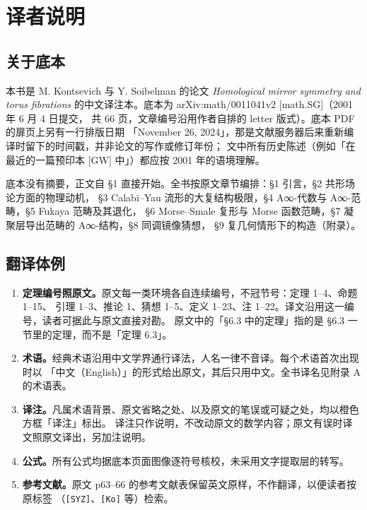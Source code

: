 \section*{译者说明}

\subsection*{关于底本}

本书是 M. Kontsevich 与 Y. Soibelman 的论文 \emph{Homological mirror symmetry and torus
fibrations} 的中文译注本。底本为 arXiv:math/0011041v2 [math.SG]（2001 年 6 月 4 日提交，
共 66 页，文章编号沿用作者自排的 letter 版式）。底本 PDF 的扉页上另有一行排版日期
「November 26, 2024」，那是文献服务器后来重新编译时留下的时间戳，并非论文的写作或修订年份；
文中所有历史陈述（例如「在最近的一篇预印本 [GW] 中」）都应按 2001 年的语境理解。

底本没有摘要，正文自 §1 直接开始。全书按原文章节编排：§1 引言，§2 共形场论方面的物理动机，
§3 Calabi–Yau 流形的大复结构极限，§4 A∞-代数与 A∞-范畴，§5 Fukaya 范畴及其退化，
§6 Morse–Smale 复形与 Morse 函数范畴，§7 凝聚层导出范畴的 A∞-结构，§8 同调镜像猜想，
§9 复几何情形下的构造（附录）。

\subsection*{翻译体例}

\begin{enumerate}[leftmargin=2.2em,itemsep=2pt]
\item \textbf{定理编号照原文。}原文每一类环境各自连续编号，不冠节号：定理 1–4、命题 1–15、
      引理 1–3、推论 1、猜想 1–5、定义 1–23、注 1–22。译文沿用这一编号，读者可据此与原文直接对勘。
      原文中的「§6.3 中的定理」指的是 §6.3 一节里的定理，而不是「定理 6.3」。
\item \textbf{术语。}经典术语沿用中文学界通行译法，人名一律不音译。每个术语首次出现时以
      「中文（English）」的形式给出原文，其后只用中文。全书译名见附录 A 的术语表。
\item \textbf{译注。}凡属术语背景、原文省略之处、以及原文的笔误或可疑之处，均以橙色方框「译注」标出。
      译注只作说明，不改动原文的数学内容；原文有误时译文照原文译出，另加注说明。
\item \textbf{公式。}所有公式均据底本页面图像逐符号核校，未采用文字提取层的转写。
\item \textbf{参考文献。}原文 p63–66 的参考文献表保留英文原样，不作翻译，以便读者按原标签
      （\texttt{[SYZ]}、\texttt{[Ko]} 等）检索。
\end{enumerate}

